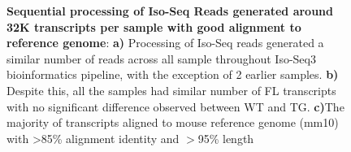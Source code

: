 \begin{figure}[htp]
\begin{center}
	\end{center}
	\captionsetup{width=0.95\textwidth}
	\caption[Sequential processing and alignment of reads from Whole Transcriptome Iso-Seq run]%
	{\textbf{Sequential processing of Iso-Seq Reads generated around 32K transcripts per sample with good alignment to reference genome}: \textbf{a)} Processing of Iso-Seq reads generated a similar number of reads across all sample throughout Iso-Seq3 bioinformatics pipeline, with the exception of 2 earlier samples. \textbf{b)} Despite this, all the samples had similar number of FL transcripts with no significant difference observed between WT and TG. \textbf{c)}The majority of transcripts aligned to mouse reference genome (mm10) with >85\% alignment identity and $>$95\% length}
	\label{fig:isoseq_whole_processing}
\end{figure}


